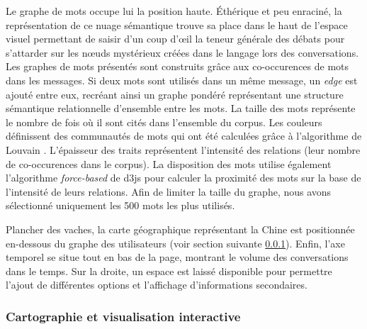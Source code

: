     Le graphe de mots occupe lui la position haute. Éthérique et peu enraciné, la représentation de ce nuage sémantique trouve sa place dans le haut de l'espace visuel permettant de saisir d'un coup d’œil la teneur générale des débats pour s'attarder sur les nœuds mystérieux créées dans le langage lors des conversations. Les graphes de mots présentés sont construits gr\^ace aux co-occurences de mots dans les messages. Si deux mots sont utilisés dans un m\^eme message, un \textit{edge} est ajouté entre eux, recréant ainsi un graphe pondéré représentant une structure sémantique relationnelle d{\textquoteright}ensemble entre les mots. La taille des mots représente le nombre de fois o\`u il sont cités dans l{\textquoteright}ensemble du corpus. Les couleurs définissent des communautés de mots qui ont été calculées gr\^ace à l{\textquoteright}algorithme de Louvain \citep{Blondel2008}. L{\textquoteright}épaisseur des traits représentent l{\textquoteright}intensité des relations (leur nombre de co-occurences dans le corpus). La disposition des mots utilise également l{\textquoteright}algorithme \textit{force-based} de d3js \citep{Bostock2011} pour calculer la proximité des mots sur la base de l{\textquoteright}intensité de leurs relations. Afin de limiter la taille du graphe, nous avons sélectionné uniquement les 500 mots les plus utilisés.  


    Plancher des vaches, la carte géographique représentant la Chine est positionnée en-dessous du graphe des utilisateurs (voir section suivante \ref{sec:le_temps_et_la_carte}). Enfin, l'axe temporel se situe tout en bas de la page, montrant le volume des conversations dans le temps. Sur la droite, un espace est laissé disponible pour permettre l'ajout de différentes options et l'affichage d'informations secondaires.
    

\subsubsection{Cartographie et visualisation interactive} 
\label{sec:le_temps_et_la_carte}
    
